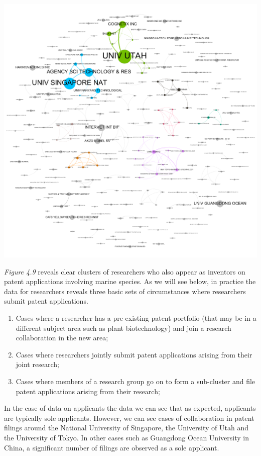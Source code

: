 \documentclass[]{book}
\providecommand{\tightlist}{%
  \setlength{\itemsep}{0pt}\setlength{\parskip}{0pt}}
\theoremstyle{definition}
\theoremstyle{definition}
\theoremstyle{definition}
\theoremstyle{remark}
\begin{document}
\includegraphics[width=14.22in]{images-patents/author_inventor_applicants_network}

\emph{Figure 4.9} reveals clear clusters of researchers who also appear
as inventors on patent applications involving marine species. As we will
see below, in practice the data for researchers reveals three basic sets
of circumstances where researchers submit patent applications.

\begin{enumerate}
\def\labelenumi{\alph{enumi})}
\tightlist
\item
  Cases where a researcher has a pre-existing patent portfolio (that may
  be in a different subject area such as plant biotechnology) and join a
  research collaboration in the new area;
\item
  Cases where researchers jointly submit patent applications arising
  from their joint research;
\item
  Cases where members of a research group go on to form a sub-cluster
  and file patent applications arising from their research;
\end{enumerate}

In the case of data on applicants the data we can see that as expected,
applicants are typically sole applicants. However, we can see cases of
collaboration in patent filings around the National University of
Singapore, the University of Utah and the University of Tokyo. In other
cases such as Guangdong Ocean University in China, a significant number
of filings are observed as a sole applicant.
\end{document}
